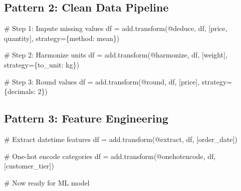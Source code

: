 \documentclass[
  letterpaper,
]{scrbook}
\newenvironment{Shaded}{\begin{snugshade}}{\end{snugshade}}
\newcommand{\CommentTok}[1]{\textcolor[rgb]{0.37,0.37,0.37}{#1}}
\newcommand{\DecValTok}[1]{\textcolor[rgb]{0.68,0.00,0.00}{#1}}
\newcommand{\NormalTok}[1]{\textcolor[rgb]{0.00,0.23,0.31}{#1}}
\newcommand{\OperatorTok}[1]{\textcolor[rgb]{0.37,0.37,0.37}{#1}}
\newcommand{\StringTok}[1]{\textcolor[rgb]{0.13,0.47,0.30}{#1}}
\begin{document}
\subsection{Pattern 2: Clean Data
Pipeline}\label{pattern-2-clean-data-pipeline}

\begin{Shaded}
\begin{Highlighting}[]
\CommentTok{\# Step 1: Impute missing values}
\NormalTok{df }\OperatorTok{=}\NormalTok{ add.transform(}\StringTok{\textquotesingle{}@deduce\textquotesingle{}}\NormalTok{, df, [}\StringTok{\textquotesingle{}price\textquotesingle{}}\NormalTok{, }\StringTok{\textquotesingle{}quantity\textquotesingle{}}\NormalTok{], strategy}\OperatorTok{=}\NormalTok{\{}\StringTok{\textquotesingle{}method\textquotesingle{}}\NormalTok{: }\StringTok{\textquotesingle{}mean\textquotesingle{}}\NormalTok{\})}

\CommentTok{\# Step 2: Harmonize units}
\NormalTok{df }\OperatorTok{=}\NormalTok{ add.transform(}\StringTok{\textquotesingle{}@harmonize\textquotesingle{}}\NormalTok{, df, [}\StringTok{\textquotesingle{}weight\textquotesingle{}}\NormalTok{], strategy}\OperatorTok{=}\NormalTok{\{}\StringTok{\textquotesingle{}to\_unit\textquotesingle{}}\NormalTok{: }\StringTok{\textquotesingle{}kg\textquotesingle{}}\NormalTok{\})}

\CommentTok{\# Step 3: Round values}
\NormalTok{df }\OperatorTok{=}\NormalTok{ add.transform(}\StringTok{\textquotesingle{}@round\textquotesingle{}}\NormalTok{, df, [}\StringTok{\textquotesingle{}price\textquotesingle{}}\NormalTok{], strategy}\OperatorTok{=}\NormalTok{\{}\StringTok{\textquotesingle{}decimals\textquotesingle{}}\NormalTok{: }\DecValTok{2}\NormalTok{\})}
\end{Highlighting}
\end{Shaded}

\subsection{Pattern 3: Feature
Engineering}\label{pattern-3-feature-engineering}

\begin{Shaded}
\begin{Highlighting}[]
\CommentTok{\# Extract datetime features}
\NormalTok{df }\OperatorTok{=}\NormalTok{ add.transform(}\StringTok{\textquotesingle{}@extract\textquotesingle{}}\NormalTok{, df, [}\StringTok{\textquotesingle{}order\_date\textquotesingle{}}\NormalTok{])}

\CommentTok{\# One{-}hot encode categories}
\NormalTok{df }\OperatorTok{=}\NormalTok{ add.transform(}\StringTok{\textquotesingle{}@onehotencode\textquotesingle{}}\NormalTok{, df, [}\StringTok{\textquotesingle{}customer\_tier\textquotesingle{}}\NormalTok{])}

\CommentTok{\# Now ready for ML model}
\end{Highlighting}
\end{Shaded}
\end{document}
